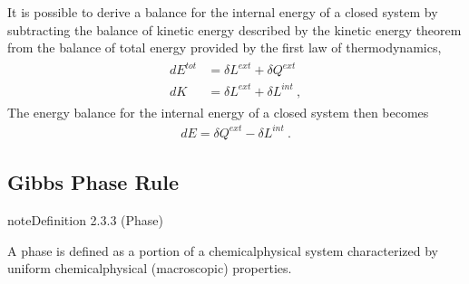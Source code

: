\documentclass[letterpaper,10pt,english]{jupyterBook}
\begin{document}
\sphinxAtStartPar
It is possible to derive a balance for the internal energy of a closed system by subtracting the balance of kinetic energy described by the kinetic energy theorem from the balance of total energy provided by the first law of thermodynamics,
\begin{equation*}
\begin{split}\begin{aligned}
  d E^{tot} & = \delta L^{ext} + \delta Q^{ext} \\
  d K       & = \delta L^{ext} + \delta L^{int} \ ,
\end{aligned}\end{split}
\end{equation*}
\sphinxAtStartPar
The energy balance for the internal energy of a closed system then becomes
\begin{equation*}
\begin{split}d E = \delta Q^{ext} - \delta L^{int} \ .\end{split}
\end{equation*}

\subsection{Gibbs Phase Rule}
\label{\detokenize{ch/principles-gibbs-phase-rule:gibbs-phase-rule}}\label{\detokenize{ch/principles-gibbs-phase-rule:physics-hs-thermodynamics-foundation-principles-gibbs-phase-rule-gibbs-phase-rule}}\label{ch/principles-gibbs-phase-rule:definition-3}
\begin{sphinxadmonition}{note}{Definition 2.3.3 (Phase)}



\sphinxAtStartPar
A phase is defined as a portion of a chemical\sphinxhyphen{}physical system characterized by uniform chemical\sphinxhyphen{}physical (macroscopic) properties.
\end{sphinxadmonition}
\end{document}
